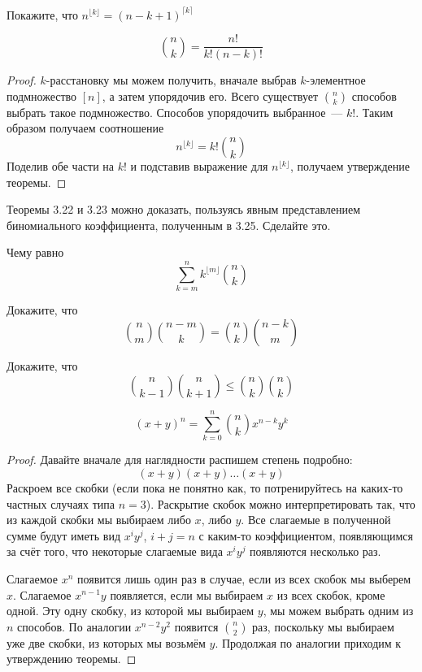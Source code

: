 \begin{exercise}
Покажите, что $n^{\lfloor k \rfloor} = (n-k+1)^{\lceil k \rceil}$
\end{exercise}

\begin{thm}
$${n \choose k} = \frac{n!}{k!(n-k)!}$$
\end{thm}
\begin{proof}
$k$-расстановку мы можем получить, вначале выбрав $k$-элементное подмножество $[n]$, а затем упорядочив его. Всего существует $n\choose k$ способов выбрать такое подмножество. Способов упорядочить выбранное~— $k!$. Таким образом получаем соотношение
$$n^{\lfloor k \rfloor} = k!{n\choose k}$$
Поделив обе части на $k!$ и подставив выражение для $n^{\lfloor k \rfloor}$, получаем утверждение теоремы.
\end{proof}

\begin{exercise}
Теоремы 3.22 и 3.23 можно доказать, пользуясь явным представлением биномиального коэффициента, полученным в 3.25. Сделайте это.
\end{exercise}

\begin{exercise}
Чему равно $$\sum_{k=m}^n k^{\lfloor m\rfloor} {n\choose k}$$
\end{exercise}

\begin{exercise}
Докажите, что $${n\choose m}{n-m\choose k} = {n\choose k}{n-k\choose m}$$
\end{exercise}

\begin{exercise}
Докажите, что $${n\choose k-1}{n\choose k+1} \le {n\choose k}{n\choose k}$$
\end{exercise}

\begin{thm}
$$(x+y)^n = \sum_{k=0}^n {n \choose k} x^{n-k} y^k$$
\end{thm}
\begin{proof}
Давайте вначале для наглядности распишем степень подробно:
$$(x+y)(x+y)\ldots(x+y)$$
Раскроем все скобки (если пока не понятно как, то потренируйтесь на каких-то частных случаях типа $n=3$). Раскрытие скобок можно интерпретировать так, что из каждой скобки мы выбираем либо $x$, либо $y$. Все слагаемые в полученной сумме будут иметь вид $x^iy^j$, $i+j=n$ с каким-то коэффициентом, появляющимся за счёт того, что некоторые слагаемые вида $x^iy^j$ появляются несколько раз.

Слагаемое $x^n$ появится лишь один раз в случае, если из всех скобок мы выберем $x$. Слагаемое $x^{n-1}y$ появляется, если мы выбираем $x$ из всех скобок, кроме одной. Эту одну скобку, из которой мы выбираем $y$, мы можем выбрать одним из $n$ способов. По аналогии $x^{n-2}y^2$ появится $n\choose 2$ раз, поскольку мы выбираем уже две скобки, из которых мы возьмём $y$. Продолжая по аналогии приходим к утверждению теоремы.
\end{proof}

